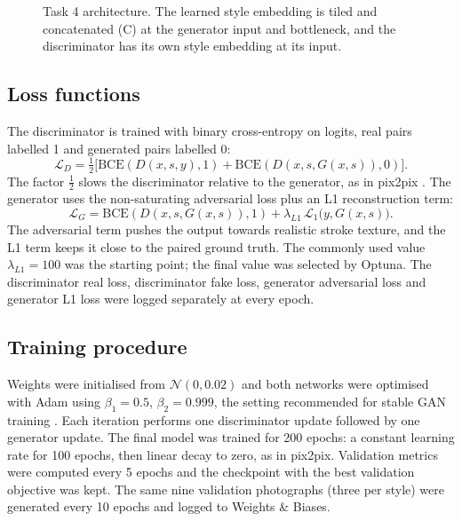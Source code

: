 \documentclass[conference]{IEEEtran}
\begin{document}
\begin{figure}[t]
{}
\caption{Task 4 architecture. The learned style embedding is tiled and concatenated (C) at the generator input and bottleneck, and the discriminator has its own style embedding at its input.}
\label{fig:t4_arch}
\end{figure}

\subsection{Loss functions}
The discriminator is trained with binary cross-entropy on logits, real pairs labelled 1 and generated pairs labelled 0:
\begin{equation}
\mathcal{L}_{D} = \tfrac{1}{2}\bigl[\text{BCE}(D(x,s,y), 1) + \text{BCE}(D(x,s,G(x,s)), 0)\bigr].
\end{equation}
The factor $\tfrac{1}{2}$ slows the discriminator relative to the generator, as in pix2pix \cite{isola2017}. The generator uses the non-saturating adversarial loss plus an L1 reconstruction term:
\begin{equation}
\mathcal{L}_{G} = \text{BCE}(D(x,s,G(x,s)), 1) + \lambda_{L1}\, \mathcal{L}_{1}\bigl(y, G(x,s)\bigr).
\end{equation}
The adversarial term pushes the output towards realistic stroke texture, and the L1 term keeps it close to the paired ground truth. The commonly used value $\lambda_{L1} = 100$ \cite{isola2017} was the starting point; the final value was selected by Optuna. The discriminator real loss, discriminator fake loss, generator adversarial loss and generator L1 loss were logged separately at every epoch.

\subsection{Training procedure}
Weights were initialised from $\mathcal{N}(0, 0.02)$ and both networks were optimised with Adam \cite{kingma2015} using $\beta_1 = 0.5$, $\beta_2 = 0.999$, the setting recommended for stable GAN training \cite{radford2016}. Each iteration performs one discriminator update followed by one generator update. The final model was trained for 200 epochs: a constant learning rate for 100 epochs, then linear decay to zero, as in pix2pix. Validation metrics were computed every 5 epochs and the checkpoint with the best validation objective was kept. The same nine validation photographs (three per style) were generated every 10 epochs and logged to Weights \& Biases.
\end{document}
